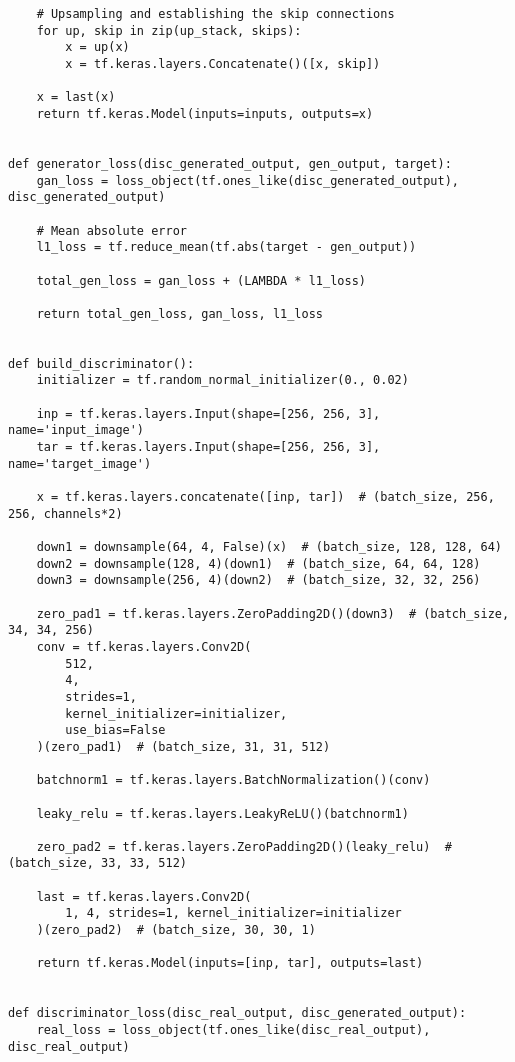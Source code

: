 \pagebreak
\begin{lstlisting}
    # Upsampling and establishing the skip connections
    for up, skip in zip(up_stack, skips):
        x = up(x)
        x = tf.keras.layers.Concatenate()([x, skip])

    x = last(x)
    return tf.keras.Model(inputs=inputs, outputs=x)


def generator_loss(disc_generated_output, gen_output, target):
    gan_loss = loss_object(tf.ones_like(disc_generated_output), disc_generated_output)

    # Mean absolute error
    l1_loss = tf.reduce_mean(tf.abs(target - gen_output))

    total_gen_loss = gan_loss + (LAMBDA * l1_loss)

    return total_gen_loss, gan_loss, l1_loss


def build_discriminator():
    initializer = tf.random_normal_initializer(0., 0.02)

    inp = tf.keras.layers.Input(shape=[256, 256, 3], name='input_image')
    tar = tf.keras.layers.Input(shape=[256, 256, 3], name='target_image')

    x = tf.keras.layers.concatenate([inp, tar])  # (batch_size, 256, 256, channels*2)

    down1 = downsample(64, 4, False)(x)  # (batch_size, 128, 128, 64)
    down2 = downsample(128, 4)(down1)  # (batch_size, 64, 64, 128)
    down3 = downsample(256, 4)(down2)  # (batch_size, 32, 32, 256)

    zero_pad1 = tf.keras.layers.ZeroPadding2D()(down3)  # (batch_size, 34, 34, 256)
    conv = tf.keras.layers.Conv2D(
        512,
        4,
        strides=1,
        kernel_initializer=initializer,
        use_bias=False
    )(zero_pad1)  # (batch_size, 31, 31, 512)

    batchnorm1 = tf.keras.layers.BatchNormalization()(conv)

    leaky_relu = tf.keras.layers.LeakyReLU()(batchnorm1)

    zero_pad2 = tf.keras.layers.ZeroPadding2D()(leaky_relu)  # (batch_size, 33, 33, 512)

    last = tf.keras.layers.Conv2D(
        1, 4, strides=1, kernel_initializer=initializer
    )(zero_pad2)  # (batch_size, 30, 30, 1)

    return tf.keras.Model(inputs=[inp, tar], outputs=last)


def discriminator_loss(disc_real_output, disc_generated_output):
    real_loss = loss_object(tf.ones_like(disc_real_output), disc_real_output)


\end{lstlisting}
